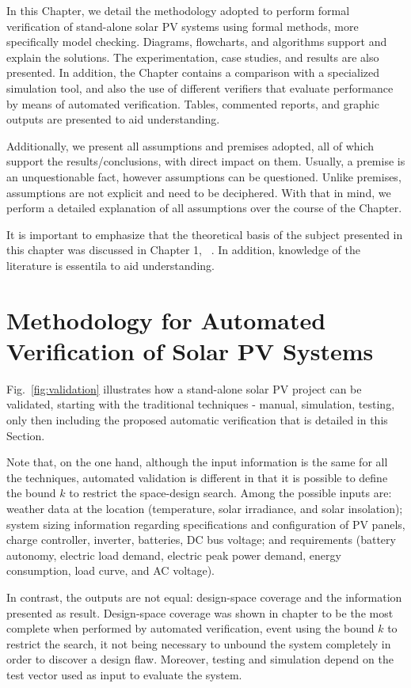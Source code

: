 In this Chapter, we detail the methodology adopted to perform formal verification of stand-alone solar PV systems using formal methods, more specifically model checking. Diagrams, flowcharts, and algorithms support and explain the solutions. The experimentation, case studies, and results are also presented. In addition, the Chapter contains a comparison with a specialized simulation tool, and also the use of different verifiers that evaluate performance by means of automated verification. Tables, commented reports, and graphic outputs are presented to aid  understanding.

Additionally, we present all assumptions and premises adopted, all of which support the results/conclusions, with direct impact on them. Usually, a premise is an unquestionable fact, however assumptions can be questioned. Unlike premises, assumptions are not explicit and need to be deciphered. With that in mind, we perform a detailed explanation of all assumptions over the course of the Chapter.

It is important to emphasize that the theoretical basis of the subject presented in this chapter was discussed in Chapter 1, ~. In addition, knowledge of the literature is essentila to aid understanding.


\section{Methodology for Automated Verification of Solar PV Systems}

Fig.~\ref{fig:validation} illustrates how a stand-alone solar PV project can be validated, starting with the traditional techniques - manual, simulation, testing, only then including the proposed automatic verification that is detailed in this Section. 

Note that, on the one hand, although the input information is the same for all the techniques, automated validation is different in that it is possible to define the bound $k$ to restrict the space-design search. Among the possible inputs are: weather data at the location (temperature, solar irradiance, and solar insolation); system sizing information regarding specifications and configuration of PV panels, charge controller, inverter, batteries, DC bus  voltage; and requirements (battery autonomy, electric load demand, electric peak power demand, energy consumption, load curve, and AC voltage).

In contrast, the outputs are not equal: design-space coverage and the information presented as result. Design-space coverage was shown in chapter  to be the most complete when performed by automated verification, event using the bound $k$ to restrict the search, it not being necessary to unbound the system completely in order to discover a design flaw. Moreover, testing and simulation depend on the test vector used as input to evaluate the system.


